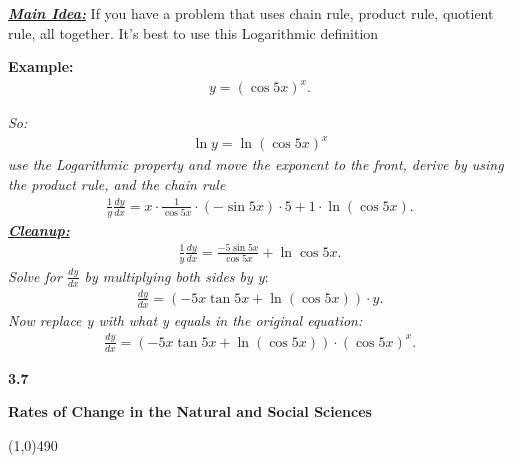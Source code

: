 \documentclass{report}
\begin{document}
  \pagebreak \bigbreak \noindent
  \begin{mdframed}
    \textbf{\textit{\underline{Main Idea:}}}
    \bigbreak \noindent 
    If you have a problem that uses chain rule, product rule, quotient rule, all together. It's best to use this Logarithmic definition
  \end{mdframed}

  \bigbreak \noindent 
  \begin{mdframed}
    \textbf{Example:}
    \begin{align*}
      y = (\cos{5x})^{x}
    .\end{align*}
  \end{mdframed}

  \bigbreak \noindent 

  \bigbreak \noindent
  \textit{So:}
  \begin{align*}
    \ln{y} = \ln{(\cos{5x})^{x}} 
  \end{align*}
  \bigbreak \noindent 
  \textit{use the Logarithmic property and move the exponent to the front, derive by using the product rule, and the chain rule}
  \begin{align*}
    \frac{1}{y} \frac{dy}{dx} = x \cdot \frac{1}{\cos{5x}} \cdot (-\sin{5x}) \cdot 5 + 1 \cdot \ln{(\cos{5x})}  
  .\end{align*}
  \bigbreak \noindent 
  \textbf{\textit{\underline{Cleanup:}}}
  \begin{align*}
    \frac{1}{y}\frac{dy}{dx} = \frac{-5\sin{5x}}{\cos{5x}} + \ln{\cos{5x}} 
  .\end{align*}
  \bigbreak \noindent 
  \textit{Solve for $\frac{dy}{dx}$ by multiplying both sides by y}:
  \begin{align*}
    \frac{dy}{dx} = (-5x\tan{5x} + \ln{(\cos{5x})}) \cdot y
  .\end{align*}
  \bigbreak \noindent 
  \textit{Now replace y with what y equals in the original equation:}
  \begin{align*}
    \frac{dy}{dx} = (-5x\tan{5x} + \ln{(\cos{5x})}) \cdot (\cos{5x})^{x}
  .\end{align*}

  \pagebreak \bigbreak \noindent
  \begin{Large}
      \begin{mdframed}
          \begin{center}
              \textbf{3.7}
          \end{center}
      \end{mdframed}
  \end{Large}
  \begin{Large}
      \begin{center}
        \textbf{Rates of Change in the Natural and Social Sciences}
      \end{center}
  \end{Large}
  \line(1,0){490}
  
\end{document}

